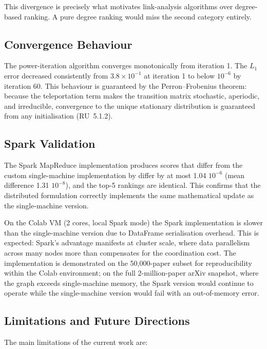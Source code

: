 \documentclass[12pt, a4paper]{article}
\begin{document}
This divergence is precisely what motivates link-analysis algorithms over degree-based ranking. A pure degree ranking would miss the second category entirely.

\subsection{Convergence Behaviour}

The power-iteration algorithm converges monotonically from iteration 1. The $L_1$ error decreased consistently from $3.8 \times 10^{-1}$ at iteration 1 to below $10^{-6}$ by iteration 60. This behaviour is guaranteed by the Perron--Frobenius theorem: because the teleportation term makes the transition matrix stochastic, aperiodic, and irreducible, convergence to the unique stationary distribution is guaranteed from any initialisation (RU~5.1.2).

\subsection{Spark Validation}

The Spark MapReduce implementation produces scores that differ from the custom single-machine implementation by differ by at most 1.04 \times $10^{-6}$ (mean difference 1.31 \times $10^{-8}$), and the top-5 rankings are identical. This confirms that the distributed formulation correctly implements the same mathematical update as the single-machine version.

On the Colab VM (2 cores, local Spark mode) the Spark implementation is slower than the single-machine version due to DataFrame serialisation overhead. This is expected: Spark's advantage manifests at cluster scale, where data parallelism across many nodes more than compensates for the coordination cost. The implementation is demonstrated on the 50{,}000-paper subset for reproducibility within the Colab environment; on the full 2-million-paper arXiv snapshot, where the graph exceeds single-machine memory, the Spark version would continue to operate while the single-machine version would fail with an out-of-memory error.

\subsection{Limitations and Future Directions}

The main limitations of the current work are:
\end{document}
